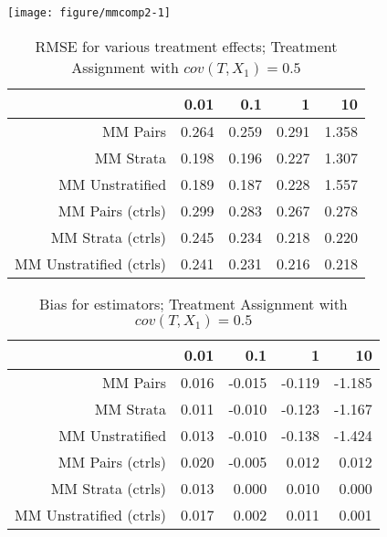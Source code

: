 \documentclass[11pt]{article}\usepackage[]{graphicx}\usepackage[]{color}
\makeatletter
\def\maxwidth{ %
  \ifdim\Gin@nat@width>\linewidth
    \linewidth
  \else
    \Gin@nat@width
  \fi
}
\newenvironment{knitrout}{}{} %
\makeatother
\begin{document}
\begin{knitrout}
\color{fgcolor}

{\centering \texttt{[image: figure/mmcomp2-1]} 

}



\end{knitrout}
\begin{table}[ht]
\centering
\begin{tabular}{rrrrr}
  \hline
 & 0.01 & 0.1 & 1 & 10 \\ 
  \hline
MM Pairs & 0.264 & 0.259 & 0.291 & 1.358 \\ 
  MM Strata & 0.198 & 0.196 & 0.227 & 1.307 \\ 
  MM Unstratified & 0.189 & 0.187 & 0.228 & 1.557 \\ 
  MM Pairs (ctrls) & 0.299 & 0.283 & 0.267 & 0.278 \\ 
  MM Strata (ctrls) & 0.245 & 0.234 & 0.218 & 0.220 \\ 
  MM Unstratified (ctrls) & 0.241 & 0.231 & 0.216 & 0.218 \\ 
   \hline
\end{tabular}
\caption{RMSE for various treatment effects; Treatment Assignment with $cov(T, X_1) = 0.5$} 
\label{tab:mmcomp2}
\end{table}
\begin{table}[ht]
\centering
\begin{tabular}{rrrrr}
  \hline
 & 0.01 & 0.1 & 1 & 10 \\ 
  \hline
MM Pairs & 0.016 & -0.015 & -0.119 & -1.185 \\ 
  MM Strata & 0.011 & -0.010 & -0.123 & -1.167 \\ 
  MM Unstratified & 0.013 & -0.010 & -0.138 & -1.424 \\ 
  MM Pairs (ctrls) & 0.020 & -0.005 & 0.012 & 0.012 \\ 
  MM Strata (ctrls) & 0.013 & 0.000 & 0.010 & 0.000 \\ 
  MM Unstratified (ctrls) & 0.017 & 0.002 & 0.011 & 0.001 \\ 
   \hline
\end{tabular}
\caption{Bias for estimators; Treatment Assignment with $cov(T, X_1) = 0.5$} 
\label{tab:mmcomp2}
\end{table}
\end{document}
